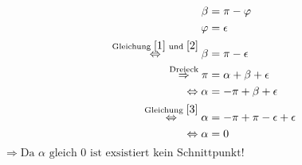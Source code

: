 	\begin{align}
		\beta &= \pi - \varphi \label{1}\\
		\varphi &= \epsilon \label{2}\\
	\overset{\text{Gleichung }\ref{1} \text{ und }\ref{2}}{\Leftrightarrow}	\beta &= \pi -\epsilon \label{3}\\
	\overset{\text{Dreieck}}{\Rightarrow} \pi &= \alpha + \beta + \epsilon \\
	\Leftrightarrow \alpha &= - \pi + \beta + \epsilon \\
	\overset{\text{Gleichung }\ref{3}}{\Leftrightarrow} \alpha &= - \pi + \pi -\epsilon + \epsilon \\
	\Leftrightarrow \alpha &= 0 
	\end{align}
	$\Rightarrow \text{Da } \alpha \text{ gleich 0 ist exsistiert kein Schnittpunkt!}$

